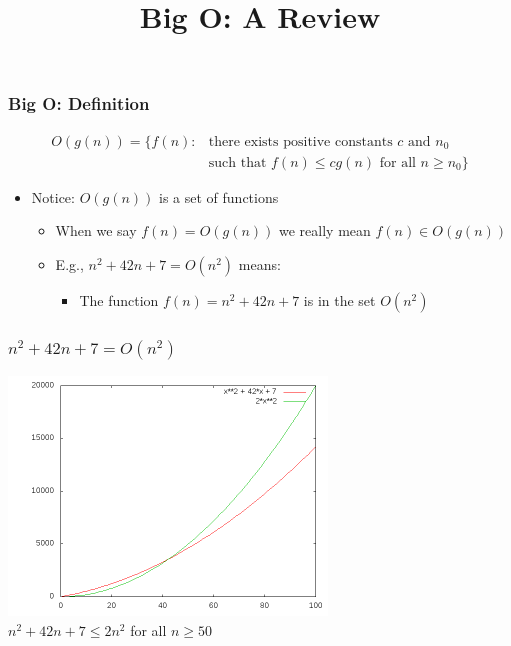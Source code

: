 \documentclass[xcolor=dvipsnames]{beamer}
\title{Big O: A Review}
\author{}
\date{}
\begin{document}
\begin{frame}
  \titlepage
\end{frame}

\begin{frame}
  \frametitle{Big O: Definition} 
   \[ \begin{array}{ll} O(g(n)) = \{ f(n) : &
          \mbox{there exists positive constants $c$ and $n_0$} \\
          & \mbox{such that $f(n) \le cg(n)$ for all $n\ge n_0$} \}\end{array} 
   \]
  \begin{itemize}
  \item<2-> Notice: $O(g(n))$ is a set of functions
   \begin{itemize}
     \item<3-> When we say $f(n)=O(g(n))$ we really mean $f(n)\in O(g(n))$
     \item<4-> E.g., $n^2 + 42n + 7 = O(n^2)$ means:
     \begin{itemize}
       \item<4-> The function $f(n)=n^2 + 42n + 7$ is in the set $O(n^2)$
     \end{itemize}
   \end{itemize}
  \end{itemize}

\end{frame}

\begin{frame}
  \frametitle{$n^2 + 42n + 7 = O(n^2)$}
  \begin{center}
    \includegraphics[height=2.5in]{images/graph} \\
    $n^2 + 42n + 7 \le 2 n^2$ for all $n\ge 50$
  \end{center}
\end{frame}
\end{document}
